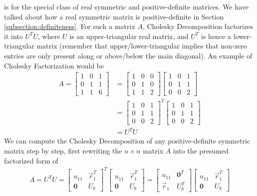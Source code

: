  is for the special class of real symmetric and positive-definite matrices. We have talked about how a real symmetric matrix is positive-definite in Section \ref{subsection:definiteness}. For such a matrix $A$, Cholesky Decomposition factorizes it into $U^TU$, where $U$ is an upper-triangular real matrix, and $U^T$ is hence a lower-triangular matrix (remember that upper/lower-triangular implies that non-zero entries are only present along or above/below the main diagonal). An example of Cholesky Factorization would be
\begin{align*}
A = 
\begin{bmatrix}
1 & 0 & 1 \\
0 & 1 & 1 \\
1 & 1 & 6
\end{bmatrix}
&=
\begin{bmatrix}
1 & 0 & 0 \\
0 & 1 & 0 \\
1 & 1 & 2
\end{bmatrix}
\begin{bmatrix}
1 & 0 & 1 \\
0 & 1 & 1 \\
0 & 0 & 2
\end{bmatrix} \\
&= 
\begin{bmatrix}
1 & 0 & 1 \\
0 & 1 & 1 \\
0 & 0 & 2
\end{bmatrix}^T
\begin{bmatrix}
1 & 0 & 1 \\
0 & 1 & 1 \\
0 & 0 & 2
\end{bmatrix} \\
&= U^TU 
\end{align*}
We can compute the Cholesky Decomposition of any positive-definite symmetric matrix step by step, first rewriting the $n \times n$ matrix $A$ into the presumed factorized form of
\begin{align}
A = U^T U = 
\begin{bmatrix}
u_{11} & \vec{r}_1^T \\
\textbf{0} & U_b 
\end{bmatrix}^T
\begin{bmatrix}
u_{11} & \vec{r}_1^T \\
\textbf{0} & U_b 
\end{bmatrix} = 
\begin{bmatrix}
u_{11} & \textbf{0}^T \\
\vec{r}_1 & U_b^T
\end{bmatrix}
\begin{bmatrix}
u_{11} & \vec{r}_1^T \\
\textbf{0} & U_b 
\end{bmatrix}
\end{align}
